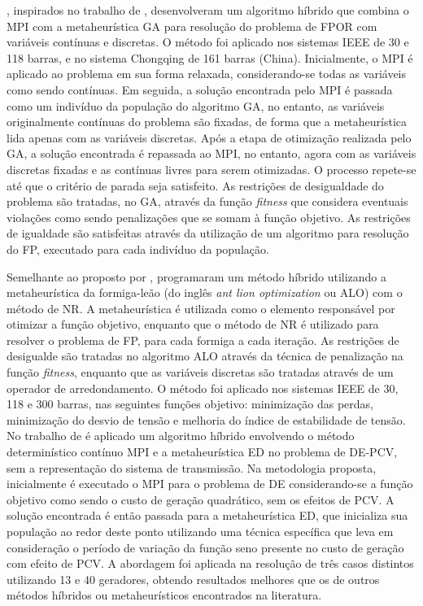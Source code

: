 , inspirados no trabalho de , desenvolveram um algoritmo híbrido que combina o MPI com a metaheurística GA para resolução do problema de FPOR com variáveis contínuas e discretas. O método foi aplicado nos sistemas IEEE de 30 e 118 barras, e no sistema Chongqing de 161 barras (China). Inicialmente, o MPI é aplicado ao problema em sua forma relaxada, considerando-se todas as variáveis como sendo contínuas. Em seguida, a solução encontrada pelo MPI é passada como um indivíduo da população do algoritmo GA, no entanto, as variáveis originalmente contínuas do problema são fixadas, de forma que a metaheurística lida apenas com as variáveis discretas. Após a etapa de otimização realizada pelo GA, a solução encontrada é repassada ao MPI, no entanto, agora com as variáveis discretas fixadas e as contínuas livres para serem otimizadas. O processo repete-se até que o critério de parada seja satisfeito. As restrições de desigualdade do problema são tratadas, no GA, através da função \emph{fitness} que considera eventuais violações como sendo penalizações que se somam à função objetivo. As restrições de igualdade são satisfeitas através da utilização de um algoritmo para resolução do FP, executado para cada indivíduo da população.


Semelhante ao proposto por ,  programaram um método híbrido utilizando a metaheurística da formiga-leão (do inglês \emph{ant lion optimization} ou ALO) com o método de NR. A metaheurística é utilizada como o elemento responsável por otimizar a função objetivo, enquanto que o método de NR é utilizado para resolver o problema de FP, para cada formiga a cada iteração. As restrições de desigualde são tratadas no algoritmo ALO através da técnica de penalização na função \emph{fitness}, enquanto que as variáveis discretas são tratadas através de um operador de arredondamento. O método foi aplicado nos sistemas IEEE de 30, 118 e 300 barras, nas seguintes funções objetivo: minimização das perdas, minimização do desvio de tensão e melhoria do índice de estabilidade de tensão.
No trabalho de  é aplicado um algoritmo híbrido envolvendo o método determinístico contínuo MPI e a metaheurística ED no problema de DE-PCV, sem a representação do sistema de transmissão. Na metodologia proposta, inicialmente é executado o MPI para o problema de DE considerando-se a função objetivo como sendo o custo de geração quadrático, sem os efeitos de PCV. A solução encontrada é então passada para a metaheurística ED, que inicializa sua população ao redor deste ponto utilizando uma técnica específica que leva em consideração o período de variação da função seno presente no custo de geração com efeito de PCV. A abordagem foi aplicada na resolução de três casos distintos utilizando 13 e 40 geradores, obtendo resultados melhores que os de outros métodos híbridos ou metaheurísticos encontrados na literatura. 
